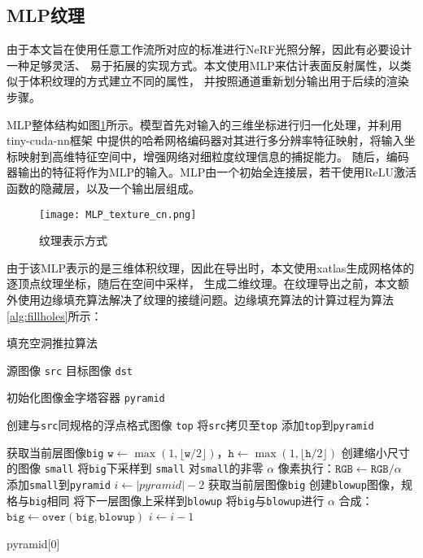 \subsection{MLP纹理} \label{sec:mlp_texture}
由于本文旨在使用任意工作流所对应的标准进行NeRF光照分解，因此有必要设计一种足够灵活、
易于拓展的实现方式。本文使用MLP来估计表面反射属性，以类似于体积纹理的方式建立不同的属性，
并按照通道重新划分输出用于后续的渲染步骤。

MLP整体结构如图\ref{fig:mlp_texture_cn}所示。模型首先对输入的三维坐标进行归一化处理，并利用tiny-cuda-nn框架\cite{Muller_tiny-cuda-nn_2021}
中提供的哈希网格编码器对其进行多分辨率特征映射，将输入坐标映射到高维特征空间中，增强网络对细粒度纹理信息的捕捉能力。
随后，编码器输出的特征将作为MLP的输入。MLP由一个初始全连接层，若干使用ReLU激活函数的隐藏层，以及一个输出层组成。
\begin{figure}[htb]
  \centering
  \texttt{[image: MLP\_texture\_cn.png]}
  \caption{纹理表示方式}
  \label{fig:mlp_texture_cn}
\end{figure}

由于该MLP表示的是三维体积纹理，因此在导出时，本文使用xatlas\cite{yang_2021}生成网格体的逐顶点纹理坐标，随后在空间中采样，
生成二维纹理。在纹理导出之前，本文额外使用边缘填充算法解决了纹理的接缝问题。边缘填充算法的计算过程为算法\ref{alg:fillholes}所示：

\renewcommand{\algorithmicrequire}{\textbf{输入：}\unskip}
\renewcommand{\algorithmicensure}{\textbf{输出：}\unskip}

\begin{algorithm}
  \caption{填充空洞推拉算法}
  \label{alg:fillholes}
  \small
  \begin{algorithmic}[1]
  \REQUIRE 源图像 \texttt{src}
  \ENSURE 目标图像 \texttt{dst}
  
  \STATE 初始化图像金字塔容器 \texttt{pyramid}
  
  \STATE 创建与\texttt{src}同规格的浮点格式图像 \texttt{top}
  \STATE 将\texttt{src}拷贝至\texttt{top}
  \STATE 添加\texttt{top}到\texttt{pyramid}
  
      \STATE 获取当前层图像\texttt{big}
      \STATE $\texttt{w} \gets \max(1, \lfloor \texttt{w}/2 \rfloor)$，$\texttt{h} \gets \max(1, \lfloor \texttt{h}/2 \rfloor)$
      \STATE 创建缩小尺寸的图像 \texttt{small}
      \STATE 将\texttt{big}下采样到 \texttt{small}
      \STATE 对\texttt{small}的非零 $\alpha$ 像素执行：$\texttt{RGB} \gets \texttt{RGB} / \alpha$
      \STATE 添加\texttt{small}到\texttt{pyramid}
  \ENDWHILE
  \STATE $i \gets |pyramid| - 2$
      \STATE 获取当前层图像\texttt{big}
      \STATE 创建\texttt{blowup}图像，规格与\texttt{big}相同
      \STATE 将下一层图像上采样到\texttt{blowup}
      \STATE 将\texttt{big}与\texttt{blowup}进行 $\alpha$ 合成：$\texttt{big} \gets \texttt{over}(\texttt{big}, \texttt{blowup})$
      \STATE $i \gets i - 1$
  \ENDWHILE

  \RETURN pyramid[0]
  \end{algorithmic}
  \end{algorithm}

